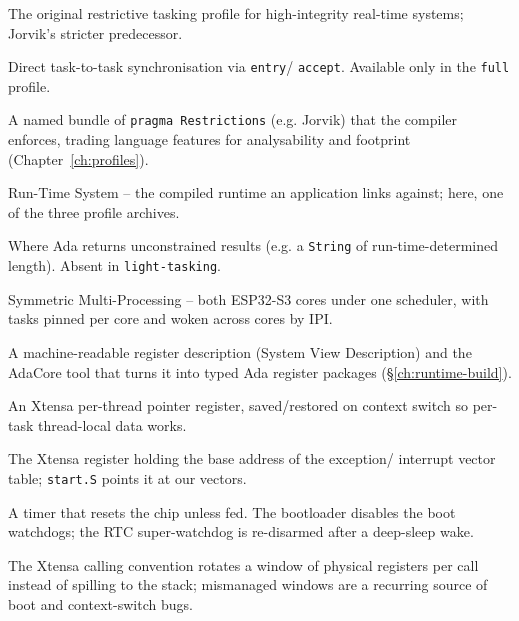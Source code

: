 \begin{description}[style=nextline, leftmargin=0pt]
\item[Ravenscar] The original restrictive tasking profile for high-integrity
  real-time systems; Jorvik's stricter predecessor.

\item[rendezvous] Direct task-to-task synchronisation via \texttt{entry}/
  \texttt{accept}. Available only in the \texttt{full} profile.

\item[restriction profile] A named bundle of \texttt{pragma Restrictions} (e.g.
  Jorvik) that the compiler enforces, trading language features for analysability
  and footprint (Chapter~\ref{ch:profiles}).

\item[RTS] Run-Time System -- the compiled runtime an application links against;
  here, one of the three profile archives.

\item[secondary stack] Where Ada returns unconstrained results (e.g. a
  \texttt{String} of run-time-determined length). Absent in \texttt{light-tasking}.

\item[SMP] Symmetric Multi-Processing -- both ESP32-S3 cores under one scheduler,
  with tasks pinned per core and woken across cores by IPI.

\item[SVD / \texttt{svd2ada}] A machine-readable register description (System View
  Description) and the AdaCore tool that turns it into typed Ada register packages
  (\S\ref{ch:runtime-build}).

\item[\texttt{THREADPTR}] An Xtensa per-thread pointer register, saved/restored on
  context switch so per-task thread-local data works.

\item[VECBASE] The Xtensa register holding the base address of the exception/
  interrupt vector table; \texttt{start.S} points it at our vectors.

\item[watchdog (WDT)] A timer that resets the chip unless fed. The bootloader
  disables the boot watchdogs; the RTC super-watchdog is re-disarmed after a
  deep-sleep wake.

\item[window (register window)] The Xtensa calling convention rotates a window of
  physical registers per call instead of spilling to the stack; mismanaged
  windows are a recurring source of boot and context-switch bugs.


\end{description}
